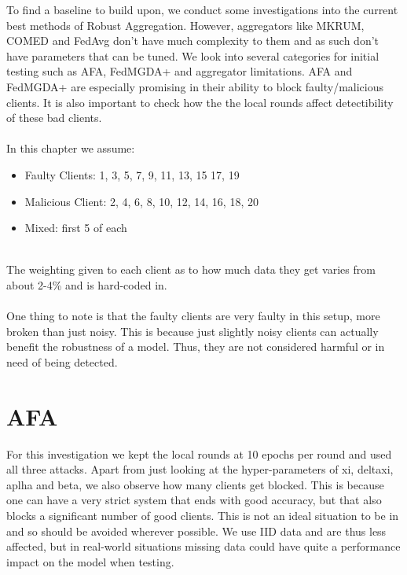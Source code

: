 To find a baseline to build upon, we conduct some investigations into the current best methods of Robust Aggregation.
However, aggregators like MKRUM, COMED and FedAvg don't have much complexity to them and as such don't have parameters that can be tuned.
We look into several categories for initial testing such as AFA, FedMGDA+ and aggregator limitations. 
AFA and FedMGDA+ are especially promising in their ability to block faulty/malicious clients. 
It is also important to check how the the local rounds affect detectibility of these bad clients.
\\ \\
In this chapter we assume:
\begin{itemize}
    \item Faulty Clients: 1, 3, 5, 7, 9, 11, 13, 15 17, 19
    \item Malicious Client: 2, 4, 6, 8, 10, 12, 14, 16, 18, 20
    \item Mixed: first 5 of each
\end{itemize}
\\
The weighting given to each client as to how much data they get varies from about 2-4\% and is hard-coded in.
\\ \\
One thing to note is that the faulty clients are very faulty in this setup, more broken than just noisy.
This is because just slightly noisy clients can actually benefit the robustness of a model. 
Thus, they are not considered harmful or in need of being detected.

\section{AFA}
For this investigation we kept the local rounds at 10 epochs per round and used all three attacks.
Apart from just looking at the hyper-parameters of xi, deltaxi, aplha and beta, we also observe how many clients get blocked.
This is because one can have a very strict system that ends with good accuracy, but that also blocks a significant number of good clients.
This is not an ideal situation to be in and so should be avoided wherever possible.
We use IID data and are thus less affected, but in real-world situations missing data could have quite a performance impact on the model when testing.

